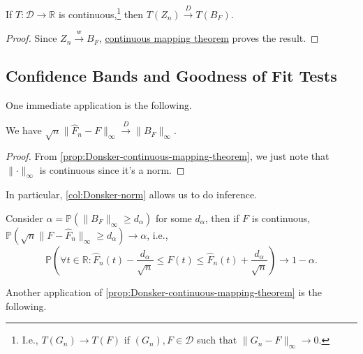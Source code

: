 \begin{proposition}\label{prop:Donsker-continuous-mapping-theorem}
	If \(T \colon \mathcal{D} \to \mathbb{R} \) is continuous,\footnote{I.e., \(T(G_n) \to T(F)\) if \((G_n), F \in \mathcal{D} \) such that \(\lVert G_n - F \rVert _\infty \to 0\).} then \(T(Z_n) \overset{D}{\to} T(B_F)\).
\end{proposition}
\begin{proof}
	Since \(Z_n \overset{\text{w} }{\to} B_F\), \hyperref[thm:continuous-mapping]{continuous mapping theorem} proves the result.
\end{proof}

\subsection{Confidence Bands and Goodness of Fit Tests}
One immediate application is the following.

\begin{corollary}\label{col:Donsker-norm}
	We have \(\sqrt{n} \lVert \hat{F} _n - F \rVert _\infty \overset{D}{\to} \lVert B_F \rVert _\infty \).
\end{corollary}
\begin{proof}
	From \autoref{prop:Donsker-continuous-mapping-theorem}, we just note that \(\lVert \cdot \rVert _\infty \) is continuous since it's a norm.
\end{proof}

In particular, \autoref{col:Donsker-norm} allows us to do inference.

\begin{eg}
	Consider \(\alpha = \mathbb{P} (\lVert B_F \rVert _\infty \geq d_\alpha )\) for some \(d_\alpha \), then if \(F\) is continuous, \(\mathbb{P} (\sqrt{n} \lVert F - \hat{F} _n \rVert _\infty \geq d_\alpha ) \to \alpha\), i.e.,
	\[
		\mathbb{P} \left(\forall t \in \mathbb{R} \colon \hat{F} _n(t) - \frac{d_\alpha }{\sqrt{n} } \leq F(t) \leq \hat{F} _n(t) + \frac{d_\alpha }{\sqrt{n} } \right) \to 1 - \alpha .
	\]
\end{eg}

Another application of \autoref{prop:Donsker-continuous-mapping-theorem} is the following.

